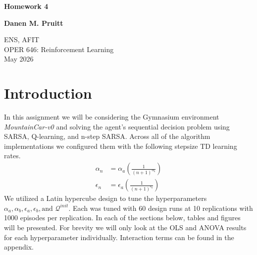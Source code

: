 \documentclass{article}
\begin{document}
\begin{titlepage}
    \centering
    \vspace*{2cm} %
    
    {\Huge \textbf{Homework 4}} \\
    
    \vspace{2cm}
    
    {\Large \textbf{Danen M. Pruitt}} \\
    
    \vspace{1.5cm}
    
    ENS, AFIT \\
    OPER 646: Reinforcement Learning \\
    May 2026
    
    \vfill %
    
\end{titlepage}

\newpage
\tableofcontents
\newpage

\section{Introduction}
In this assignment we will be considering the Gymnasium environment \textit{MountainCar-v0} and solving the agent's sequential decision problem using SARSA, Q-learning, and n-step SARSA. Across all of the algorithm implementations we configured them with the following stepsize TD learning rates.
\begin{align*}
    \alpha_n &= \alpha_a\left(\frac{1}{(n+1)^{\alpha_b}}\right)\\
    \epsilon_n &= \epsilon_a\left(\frac{1}{(n+1)^{\epsilon_b}}\right)
\end{align*}
We utilized a Latin hypercube design to tune the hyperparameters $\alpha_a, \alpha_b, \epsilon_a,\epsilon_b, \text{and } \mathcal{Q}^{init}$. Each was tuned with 60 design runs at 10 replications with 1000 episodes per replication. In each of the sections below, tables and figures will be presented. For brevity we will only look at the OLS and ANOVA results for each hyperparameter individually. Interaction terms can be found in the appendix.
\end{document}
